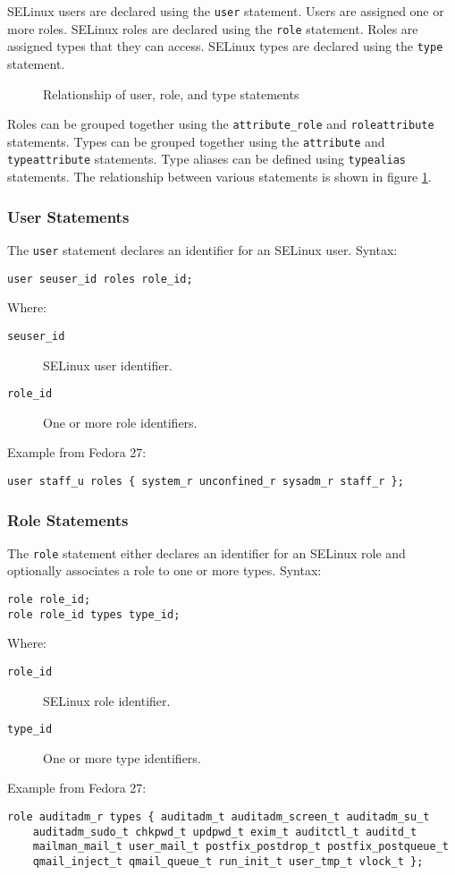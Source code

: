 SELinux users are declared using the \texttt{user} statement. Users are assigned
one or more roles. SELinux roles are declared using the \texttt{role} statement.
Roles are assigned types that they can access. SELinux types are declared using
the \texttt{type} statement.

\begin{figure}
    \centering
    \label{fig:userroletype}
    
    \caption{Relationship of user, role, and type statements}
\end{figure}

Roles can be grouped together using the \texttt{attribute\_role} and
\texttt{roleattribute} statements. Types can be grouped together using the
\texttt{attribute} and \texttt{typeattribute} statements. Type aliases can be
defined using \texttt{typealias} statements. The relationship between various
statements is shown in figure \ref{fig:userroletype}.

\subsubsection{User Statements}
The \texttt{user} statement declares an identifier for an SELinux user. Syntax:
\begin{lstlisting}[language=te]
user seuser_id roles role_id;
\end{lstlisting}
Where:
\begin{description}
    \item [\texttt{seuser\_id}] SELinux user identifier.
    \item [\texttt{role\_id}] One or more role identifiers.
\end{description}
Example from Fedora 27:
\begin{lstlisting}[language=te]
user staff_u roles { system_r unconfined_r sysadm_r staff_r };
\end{lstlisting}

\subsubsection{Role Statements}
The \texttt{role} statement either declares an identifier for an SELinux role
and optionally associates a role to one or more types. Syntax:
\begin{lstlisting}[language=te]
role role_id;
role role_id types type_id;
\end{lstlisting}
Where:
\begin{description}
    \item [\texttt{role\_id}] SELinux role identifier.
    \item [\texttt{type\_id}] One or more type identifiers.
\end{description}
Example from Fedora 27:
\begin{lstlisting}[language=te]
role auditadm_r types { auditadm_t auditadm_screen_t auditadm_su_t
    auditadm_sudo_t chkpwd_t updpwd_t exim_t auditctl_t auditd_t
    mailman_mail_t user_mail_t postfix_postdrop_t postfix_postqueue_t
    qmail_inject_t qmail_queue_t run_init_t user_tmp_t vlock_t };
\end{lstlisting}


